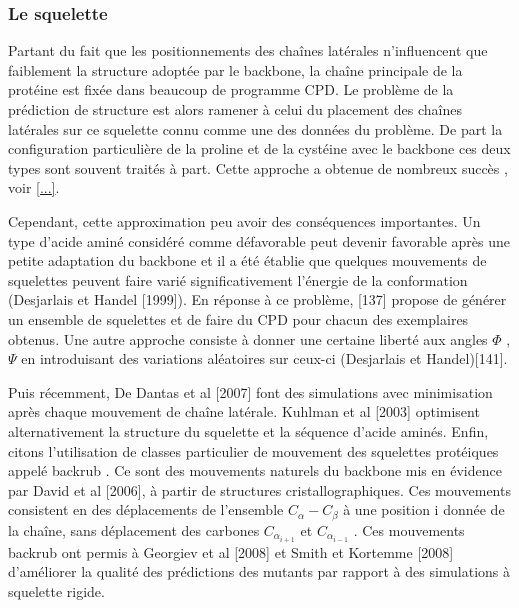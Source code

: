 \subsubsection{Le squelette}
Partant du fait que les positionnements des chaînes latérales n'influencent que faiblement la structure adoptée par le backbone, la chaîne principale de la protéine est fixée dans beaucoup de programme CPD. Le problème de la prédiction de structure est alors ramener à celui du placement des chaînes latérales sur ce squelette connu comme une des données du problème. De part la configuration particulière de la proline et de la cystéine avec le backbone ces deux types sont souvent traités à part. Cette approche a obtenue de nombreux succès , voir \ref{...}.

Cependant, cette approximation peu avoir des conséquences importantes. Un type d'acide aminé considéré comme défavorable peut devenir favorable après une petite adaptation du backbone et il a été établie que quelques mouvements de squelettes peuvent faire varié significativement l'énergie de la conformation (Desjarlais et Handel [1999]).
En réponse à ce problème, [137] propose de générer un ensemble de squelettes et de faire du CPD pour chacun des exemplaires obtenus. Une autre approche consiste à donner une certaine liberté aux angles $\Phi$ , $\Psi$ en introduisant des variations aléatoires sur ceux-ci (Desjarlais et Handel)[141].

Puis récemment, De Dantas et al [2007] font des simulations avec minimisation après chaque mouvement de chaîne latérale. Kuhlman et al [2003] optimisent alternativement la structure du squelette et la séquence d'acide aminés. Enfin, citons l'utilisation de classes particulier de mouvement des squelettes protéiques appelé \og backrub \fg. Ce sont des mouvements naturels du backbone mis en évidence par David et al [2006], à partir de structures cristallographiques. Ces mouvements consistent en des déplacements de l'ensemble $C_{\alpha}-C_{\beta}$ à une position i donnée de la chaîne, sans déplacement des carbones $C_{\alpha_{i+1}}$ et $C_{\alpha_{i-1}}$ . Ces mouvements backrub ont permis à Georgiev et al [2008] et Smith et Kortemme [2008] d'améliorer la qualité des prédictions des mutants par rapport à des simulations à squelette rigide.

